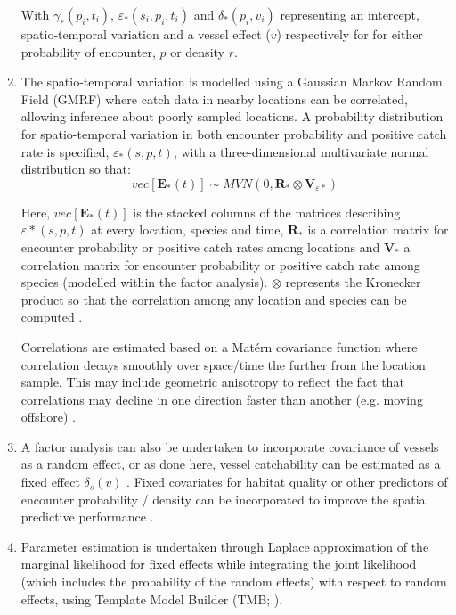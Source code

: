 \documentclass[11pt]{article}
\begin{document}
\begin{enumerate}
		With $\gamma_{*}(p_{i},t_{i})$,
		$\varepsilon_{*}(s_{i},p_{i},t_{i})$ and $\delta_{*}(p_{i},
			v_{i})$ representing an intercept, spatio-temporal
			variation and a vessel effect ($v$) respectively for for
			either probability of encounter, $p$ or density $r$.
	
	\item The spatio-temporal variation is modelled using a Gaussian
		Markov Random Field (GMRF) where catch data in nearby locations
		can be correlated, allowing inference about poorly sampled
		locations. A probability distribution for spatio-temporal
		variation in both encounter probability and positive catch rate
		is specified, $\varepsilon_{*}(s,p,t)$, with a
		three-dimensional multivariate normal distribution so that:
		\begin{equation}
			vec[\mathbf{E}_{*}(t)] \sim MVN(0,\mathbf{R}_{*} \otimes
			\mathbf{V}_{{\varepsilon}{*}})
		\end{equation}

		Here, $vec[\mathbf{E}_{*}(t)]$ is the stacked columns of the
		matrices describing $\varepsilon{*}(s,p,t)$ at every location,
		species and time, $\mathbf{R}_{*}$ is a correlation matrix for
		encounter probability or positive catch rates among locations
		and $\mathbf{V}_{*}$ a correlation matrix for encounter
		probability or positive catch rate among species (modelled
		within the factor analysis). $\otimes$ represents the Kronecker
		product so that the correlation among any location and species
		can be computed \cite{Thorson2017}.
		
		Correlations are estimated based on a Matérn covariance
		function where correlation decays smoothly over space/time the
		further from the location sample. This may include geometric
		anisotropy to reflect the fact that correlations may decline in
		one direction faster than another (e.g. moving offshore)
		\cite{Thorson2013}.

	\item A factor analysis can also be undertaken to incorporate
		covariance of vessels as a random effect, or as done here,
		vessel catchability can be estimated as a fixed effect
		$\delta_{s}(v)$ \cite{Thorson2014}. Fixed covariates for
		habitat quality or other predictors of encounter probability /
		density can be incorporated to improve the spatial predictive
		performance \cite{Thorson2017}.

	\item Parameter estimation is undertaken through Laplace approximation
		of the marginal likelihood for fixed effects while integrating
		the joint likelihood (which includes the probability of the
		random effects) with respect to random effects, using Template
		Model Builder (TMB; \cite{Kristensen2015}).


\end{enumerate}
\end{document}
